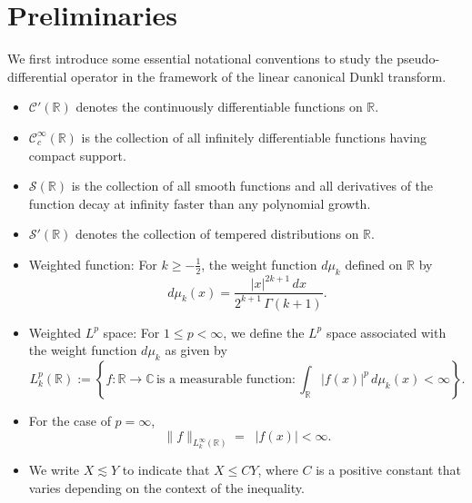 \documentclass[12pt,a4paper,reqno]{amsproc}
\theoremstyle{definition}
\theoremstyle{remark}
\numberwithin{equation}{section}
\begin{document}
\section{Preliminaries} \label{C7-S2}
We first introduce some essential notational conventions to study the pseudo-differential operator in the framework of the linear canonical Dunkl transform.
\begin{itemize}
\item[-] $\mathcal{C}'(\mathbb{R})$ denotes the continuously differentiable functions on $\mathbb{R}$.\\
\item[-]$\mathcal{C}_c^\infty(\mathbb{R})$ is the collection of all infinitely differentiable functions having compact support.\\
\item[-]  $\mathcal{S}(\mathbb{R})$ is the collection of all smooth functions and all derivatives of the function decay at infinity faster than any polynomial growth.\\
\item[-]  $\mathcal{S}'(\mathbb{R})$ denotes the collection of tempered distributions on $\mathbb{R}$.\\

\item[-] Weighted function: For $k\ge -\frac{1}{2}$, the weight function $d\mu_k$ defined on $\mathbb{R}$ by 
 \begin{equation*}
     d\mu_k(x) = \frac{
 |x|^{2k+1}\, dx}{2^{k+1}\,\Gamma(k+1)}.
 \end{equation*} 
\item[-] Weighted $L^p$ space: For $1\le p <\infty$, we define the $L^p$ space associated with the weight function $d\mu_k$ as given by 
\begin{equation*}
 L_k^p(\mathbb{R}):= \left\{ f: \mathbb{R}\rightarrow \mathbb{C}\, \text{is a measurable function}: \int_{\mathbb{R}} |f(x)|^p\,d\mu_k(x) <\infty\right\}.
 \end{equation*}
\item[-] For the case of $p=\infty$, 
\begin{equation*}
\|f\|_{L^\infty_k(\mathbb{R})} = \mathop{\underset{x \in \mathbb{R}}{\text{ess. sup}}} |f(x)| < \infty.
\end{equation*}
\item [-]  We write $X \lesssim Y$ to indicate that $X \le C Y$, where $C$  is a positive constant that varies depending on the context of the inequality.
\end{itemize}
\end{document}
